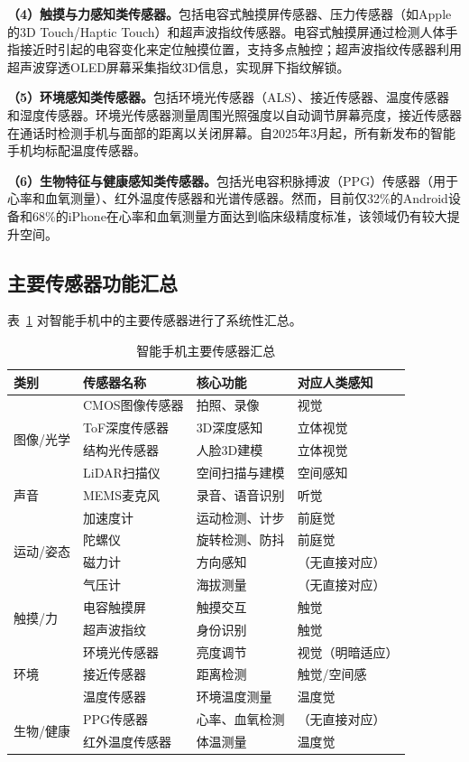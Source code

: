 \documentclass[12pt, a4paper]{ctexart}
\begin{document}
\textbf{（4）触摸与力感知类传感器。}包括电容式触摸屏传感器、压力传感器（如Apple的3D Touch/Haptic Touch）和超声波指纹传感器。电容式触摸屏通过检测人体手指接近时引起的电容变化来定位触摸位置，支持多点触控；超声波指纹传感器利用超声波穿透OLED屏幕采集指纹3D信息，实现屏下指纹解锁。

\textbf{（5）环境感知类传感器。}包括环境光传感器（ALS）、接近传感器、温度传感器和湿度传感器。环境光传感器测量周围光照强度以自动调节屏幕亮度，接近传感器在通话时检测手机与面部的距离以关闭屏幕。自2025年3月起，所有新发布的智能手机均标配温度传感器\cite{alibaba2026}。

\textbf{（6）生物特征与健康感知类传感器。}包括光电容积脉搏波（PPG）传感器（用于心率和血氧测量）、红外温度传感器和光谱传感器。然而，目前仅32\%的Android设备和68\%的iPhone在心率和血氧测量方面达到临床级精度标准\cite{alibaba2026}，该领域仍有较大提升空间。

\subsection{主要传感器功能汇总}

表~\ref{tab:sensor_overview} 对智能手机中的主要传感器进行了系统性汇总。

\begin{table}[H]
\centering
\caption{智能手机主要传感器汇总}
\label{tab:sensor_overview}
\small
\begin{tabular}{llll}
\toprule
\textbf{类别} & \textbf{传感器名称} & \textbf{核心功能} & \textbf{对应人类感知} \\
\midrule
\multirow{4}{*}{图像/光学} & CMOS图像传感器 & 拍照、录像 & 视觉 \\
 & ToF深度传感器 & 3D深度感知 & 立体视觉 \\
 & 结构光传感器 & 人脸3D建模 & 立体视觉 \\
 & LiDAR扫描仪 & 空间扫描与建模 & 空间感知 \\
\midrule
声音 & MEMS麦克风 & 录音、语音识别 & 听觉 \\
\midrule
\multirow{4}{*}{运动/姿态} & 加速度计 & 运动检测、计步 & 前庭觉 \\
 & 陀螺仪 & 旋转检测、防抖 & 前庭觉 \\
 & 磁力计 & 方向感知 & （无直接对应） \\
 & 气压计 & 海拔测量 & （无直接对应） \\
\midrule
\multirow{2}{*}{触摸/力} & 电容触摸屏 & 触摸交互 & 触觉 \\
 & 超声波指纹 & 身份识别 & 触觉 \\
\midrule
\multirow{3}{*}{环境} & 环境光传感器 & 亮度调节 & 视觉（明暗适应） \\
 & 接近传感器 & 距离检测 & 触觉/空间感 \\
 & 温度传感器 & 环境温度测量 & 温度觉 \\
\midrule
\multirow{2}{*}{生物/健康} & PPG传感器 & 心率、血氧检测 & （无直接对应） \\
 & 红外温度传感器 & 体温测量 & 温度觉 \\
\bottomrule
\end{tabular}
\end{table}
\end{document}
